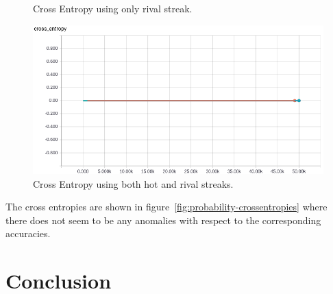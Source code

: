 \documentclass{article} %
\begin{document}
\begin{figure}[!htb]
  \caption{Cross Entropy using only rival streak.}\label{fig:probability-r-crossentropy}
\endminipage
{}%
  \includegraphics[width=\linewidth]{plots/model1/probability/streak-hr/crossentropy.png}
  \caption{Cross Entropy using both hot and rival streaks.}\label{fig:probability-hr-crossentropy}
\endminipage
\end{figure}
\label{fig:probability-crossentropies}

The cross entropies are shown in figure~\ref{fig:probability-crossentropies} where there does not seem to be any anomalies with respect to the corresponding accuracies.


\section{Conclusion}
\label{sec:conclusion}


\small{
\nocite{*}


}
\end{document}
